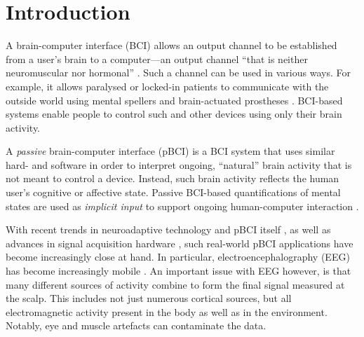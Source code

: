 \clearpage


\pagestyle{visualisation}


\section{Introduction}

A brain-computer interface (BCI) allows an output channel to be established from a user's brain to a computer---an output channel ``that is neither neuromuscular nor hormonal'' \cite{wolpaw2012newsun}. Such a channel can be used in various ways. For example, it allows paralysed or locked-in patients to communicate with the outside world using mental spellers \cite{birbaumer1999spelling} and brain-actuated prostheses \cite{mullerputz2008ssvepprosthesis}. BCI-based systems enable people to control such and other devices using only their brain activity. 

A \emph{passive} brain-computer interface (pBCI) \cite{zander2011} is a BCI system that uses similar hard- and software in order to interpret ongoing, ``natural'' brain activity \cite{krol2018interactivity} that is not meant to control a device. Instead, such brain activity reflects the human user's cognitive or affective state. Passive BCI-based quantifications of mental states are used as \emph{implicit input} to support ongoing human-computer interaction \cite{zander2014implicit}. 

With recent trends in neuroadaptive technology and pBCI itself \cite{krol2017interactivitygraz,zander2017surgery,krol2016workload,zander2017phypa}, as well as advances in signal acquisition hardware \cite{zander2017dry}, such real-world pBCI applications have become increasingly close at hand. In particular, electroencephalography (EEG) has become increasingly mobile \cite{mullen2015dry}. An important issue with EEG however, is that many different sources of activity combine to form the final signal measured at the scalp. This includes not just numerous cortical sources, but all electromagnetic activity present in the body as well as in the environment. Notably, eye and muscle artefacts can contaminate the data.

